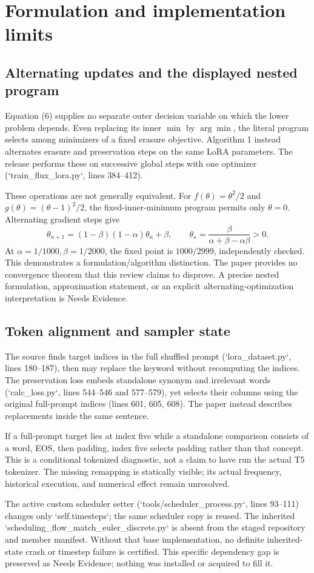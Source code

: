 \documentclass[10pt]{article}
\begin{document}
\section*{Formulation and implementation limits}
\subsection*{Alternating updates and the displayed nested program}
Equation (6) supplies no separate outer decision variable on which the lower problem depends. Even replacing its inner \(\min\) by \(\arg\min\), the literal program selects among minimizers of a fixed erasure objective. Algorithm 1 instead alternates erasure and preservation steps on the same LoRA parameters. The release performs these on successive global steps with one optimizer (`train\_flux\_lora.py`, lines 384–412).\par
These operations are not generally equivalent. For \(f(\theta)=\theta^2/2\) and \(g(\theta)=(\theta-1)^2/2\), the fixed-inner-minimum program permits only \(\theta=0\). Alternating gradient steps give \[\theta_{n+1}=(1-\beta)(1-\alpha)\theta_n+\beta,
 \qquad
 \theta_\star=\frac{\beta}{\alpha+\beta-\alpha\beta}>0.\] At \(\alpha=1/1000,\beta=1/2000\), the fixed point is \(1000/2999\), independently checked. This demonstrates a formulation/algorithm distinction. The paper provides no convergence theorem that this review claims to disprove. A precise nested formulation, approximation statement, or an explicit alternating-optimization interpretation is Needs Evidence.\par
\subsection*{Token alignment and sampler state}
The source finds target indices in the full shuffled prompt (`lora\_dataset.py`, lines 180–187), then may replace the keyword without recomputing the indices. The preservation loss embeds standalone synonym and irrelevant words (`calc\_loss.py`, lines 544–546 and 577–579), yet selects their columns using the original full-prompt indices (lines 601, 605, 608). The paper instead describes replacements inside the same sentence.\par
If a full-prompt target lies at index five while a standalone comparison consists of a word, EOS, then padding, index five selects padding rather than that concept. This is a conditional tokenized diagnostic, not a claim to have run the actual T5 tokenizer. The missing remapping is statically visible; its actual frequency, historical execution, and numerical effect remain unresolved.\par
The active custom scheduler setter (`tools/scheduler\_process.py`, lines 93–111) changes only `self.timesteps`; the same scheduler copy is reused. The inherited `scheduling\_flow\_match\_euler\_discrete.py` is absent from the staged repository and member manifest. Without that base implementation, no definite inherited-state crash or timestep failure is certified. This specific dependency gap is preserved as Needs Evidence; nothing was installed or acquired to fill it.\par
\end{document}
